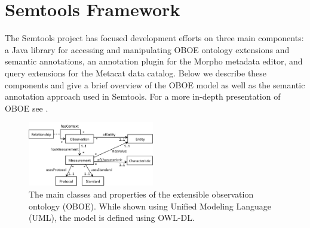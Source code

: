 
\section{Semtools Framework}
\label{sec:framework}

The Semtools project has focused development efforts on three main
components: a Java library for accessing and manipulating OBOE
ontology extensions and semantic annotations, an annotation plugin for
the Morpho metadata editor, and query extensions for the Metacat data
catalog. Below we describe these components and give a brief
overview of the OBOE model as well as the semantic annotation approach
used in Semtools. For a more in-depth presentation of OBOE see
\cite{madin07:_ontol_for_descr_and_synth,bowers08}.

\begin{figure}[!t]
  \centering
  \includegraphics[width=0.49\textwidth]{images/oboe}
  \caption{The main classes and properties of the extensible
    observation ontology (OBOE). While shown using Unified Modeling Language (UML), the model is
    defined using OWL-DL.}
  \label{fig:oboe}
\end{figure}

